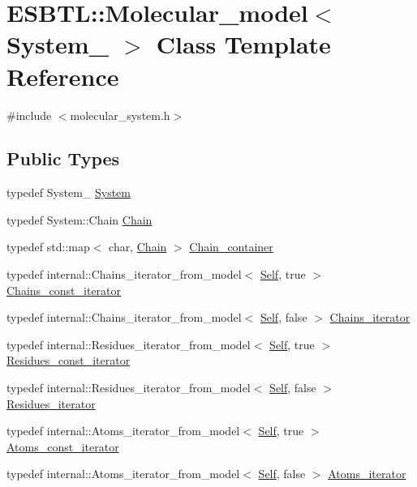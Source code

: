 \hypertarget{classESBTL_1_1Molecular__model}{}\section{E\+S\+B\+TL\+:\+:Molecular\+\_\+model$<$ System\+\_\+ $>$ Class Template Reference}
\label{classESBTL_1_1Molecular__model}


{\ttfamily \#include $<$molecular\+\_\+system.\+h$>$}

\subsection*{Public Types}
\begin{DoxyCompactItemize}
\item 
typedef System\+\_\+ \hyperlink{classESBTL_1_1Molecular__model_a08cec17302607b3b5f43c94746032996}{System}
\item 
typedef System\+::\+Chain \hyperlink{classESBTL_1_1Molecular__model_a1d055eb841e64e198a1987e120fc985d}{Chain}
\item 
typedef std\+::map$<$ char, \hyperlink{classESBTL_1_1Molecular__model_a1d055eb841e64e198a1987e120fc985d}{Chain} $>$ \hyperlink{classESBTL_1_1Molecular__model_aeea116cf3d62c0f486107ccf64b7ce0b}{Chain\+\_\+container}
\item 
typedef internal\+::\+Chains\+\_\+iterator\+\_\+from\+\_\+model$<$ \hyperlink{classESBTL_1_1Molecular__model}{Self}, true $>$ \hyperlink{group__grp__iters_ga32c6b305275f21f3b184688be9d38ffd}{Chains\+\_\+const\+\_\+iterator}
\item 
typedef internal\+::\+Chains\+\_\+iterator\+\_\+from\+\_\+model$<$ \hyperlink{classESBTL_1_1Molecular__model}{Self}, false $>$ \hyperlink{group__grp__iters_ga763cc293a5df9ae7dd6e31c198dce24b}{Chains\+\_\+iterator}
\item 
typedef internal\+::\+Residues\+\_\+iterator\+\_\+from\+\_\+model$<$ \hyperlink{classESBTL_1_1Molecular__model}{Self}, true $>$ \hyperlink{group__grp__iters_gab9417777a325c8ca02089328a4468703}{Residues\+\_\+const\+\_\+iterator}
\item 
typedef internal\+::\+Residues\+\_\+iterator\+\_\+from\+\_\+model$<$ \hyperlink{classESBTL_1_1Molecular__model}{Self}, false $>$ \hyperlink{group__grp__iters_gae3b7c7057b27581b14109723b28a3abd}{Residues\+\_\+iterator}
\item 
typedef internal\+::\+Atoms\+\_\+iterator\+\_\+from\+\_\+model$<$ \hyperlink{classESBTL_1_1Molecular__model}{Self}, true $>$ \hyperlink{group__grp__iters_ga41096063f109fca33976a17af4b3a1e4}{Atoms\+\_\+const\+\_\+iterator}
\item 
typedef internal\+::\+Atoms\+\_\+iterator\+\_\+from\+\_\+model$<$ \hyperlink{classESBTL_1_1Molecular__model}{Self}, false $>$ \hyperlink{group__grp__iters_ga458a89ea78f235b807ca0d2dfd9a0427}{Atoms\+\_\+iterator}
\end{DoxyCompactItemize}
